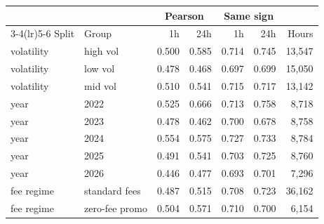 \begin{tabular}{llrrrrr}
\toprule
 & & \multicolumn{2}{c}{Pearson} & \multicolumn{2}{c}{Same sign} & \\
\cmidrule(lr){3-4}\cmidrule(lr){5-6} Split & Group & 1h & 24h & 1h & 24h & Hours\\
\midrule
volatility & high vol & 0.500 & 0.585 & 0.714 & 0.745 & 13,547\\
volatility & low vol & 0.478 & 0.468 & 0.697 & 0.699 & 15,050\\
volatility & mid vol & 0.510 & 0.541 & 0.715 & 0.717 & 13,142\\
year & 2022 & 0.525 & 0.666 & 0.713 & 0.758 & 8,718\\
year & 2023 & 0.478 & 0.462 & 0.700 & 0.678 & 8,758\\
year & 2024 & 0.554 & 0.575 & 0.727 & 0.733 & 8,784\\
year & 2025 & 0.491 & 0.541 & 0.703 & 0.725 & 8,760\\
year & 2026 & 0.446 & 0.477 & 0.693 & 0.701 & 7,296\\
fee regime & standard fees & 0.487 & 0.515 & 0.708 & 0.723 & 36,162\\
fee regime & zero-fee promo & 0.504 & 0.571 & 0.710 & 0.700 & 6,154\\
\bottomrule
\end{tabular}

